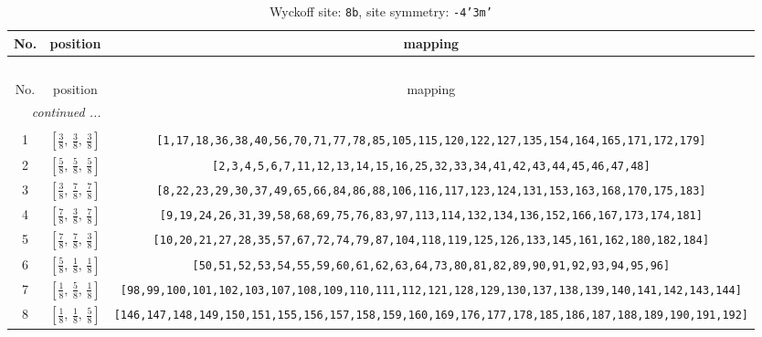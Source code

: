 \documentclass[fleqn,8pt]{jsarticle}
\begin{document}
\renewcommand{\arraystretch}{1.2}
\begin{longtable}{ccc}
\caption{Wyckoff site: {\tt 8b}, site symmetry: {\tt -4'3m'}}
 \\
 \hline \hline
No. & position & mapping \\ \hline \endfirsthead

\multicolumn{2}{l}{\tablename\ \thetable{}} \\
 \hline \hline
No. & position & mapping \\ \hline \endhead

 \hline \hline
\multicolumn{2}{r}{\footnotesize\it continued ...} \\ \endfoot

 \hline \hline
\multicolumn{2}{r}{} \\ \endlastfoot

1 & $\left[ \frac{3}{8},\, \frac{3}{8},\, \frac{3}{8} \right]$ & {\tt [1,17,18,36,38,40,56,70,71,77,78,85,105,115,120,122,127,135,154,164,165,171,172,179]} \\ \hline
2 & $\left[ \frac{5}{8},\, \frac{5}{8},\, \frac{5}{8} \right]$ & {\tt [2,3,4,5,6,7,11,12,13,14,15,16,25,32,33,34,41,42,43,44,45,46,47,48]} \\ \hline
3 & $\left[ \frac{3}{8},\, \frac{7}{8},\, \frac{7}{8} \right]$ & {\tt [8,22,23,29,30,37,49,65,66,84,86,88,106,116,117,123,124,131,153,163,168,170,175,183]} \\ \hline
4 & $\left[ \frac{7}{8},\, \frac{3}{8},\, \frac{7}{8} \right]$ & {\tt [9,19,24,26,31,39,58,68,69,75,76,83,97,113,114,132,134,136,152,166,167,173,174,181]} \\ \hline
5 & $\left[ \frac{7}{8},\, \frac{7}{8},\, \frac{3}{8} \right]$ & {\tt [10,20,21,27,28,35,57,67,72,74,79,87,104,118,119,125,126,133,145,161,162,180,182,184]} \\ \hline
6 & $\left[ \frac{5}{8},\, \frac{1}{8},\, \frac{1}{8} \right]$ & {\tt [50,51,52,53,54,55,59,60,61,62,63,64,73,80,81,82,89,90,91,92,93,94,95,96]} \\ \hline
7 & $\left[ \frac{1}{8},\, \frac{5}{8},\, \frac{1}{8} \right]$ & {\tt [98,99,100,101,102,103,107,108,109,110,111,112,121,128,129,130,137,138,139,140,141,142,143,144]} \\ \hline
8 & $\left[ \frac{1}{8},\, \frac{1}{8},\, \frac{5}{8} \right]$ & {\tt [146,147,148,149,150,151,155,156,157,158,159,160,169,176,177,178,185,186,187,188,189,190,191,192]} \\
\end{longtable}
\renewcommand{\arraystretch}{1.2}
\end{document}
